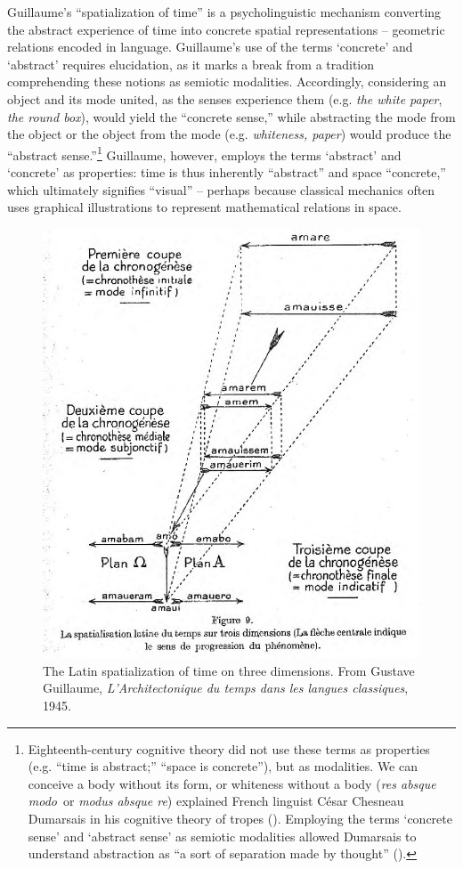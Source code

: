 \documentclass[output=paper]{langsci/langscibook}
\begin{document}
Guillaume’s “spatialization of time” is a psycholinguistic mechanism converting the abstract experience of time into concrete spatial representations -- geometric relations encoded in language. Guillaume’s use of the terms ‘concrete’ and ‘abstract’ requires elucidation, as it marks a break from a tradition comprehending these notions as semiotic modalities. Accordingly, considering an object and its mode united, as the senses experience them (e.g. \textit{the white paper}, \textit{the round box}), would yield the “concrete sense,” while abstracting the mode from the object or the object from the mode (e.g. \textit{whiteness, paper}) would produce the “abstract sense.”\footnote{Eighteenth-century cognitive theory did not use these terms as properties (e.g. “time is abstract;” “space is concrete”), but as modalities. We can conceive a body without its form, or whiteness without a body (\textit{res absque modo}~or \textit{modus absque re}) explained French linguist César Chesneau Dumarsais in his cognitive theory of tropes (\citeyear{dumarsais_tropes_1730}). Employing the terms ‘concrete sense’ and ‘abstract sense’ as semiotic modalities allowed Dumarsais to understand abstraction as “a sort of separation made by thought” (\citeyear[260]{dumarsais_tropes_1730}).} Guillaume, however, employs the terms ‘abstract’ and ‘concrete’ as properties: time is thus inherently “abstract” and space “concrete,” which ultimately signifies “visual” -- perhaps because classical mechanics often uses graphical illustrations to represent mathematical relations in space.

\begin{figure}
\includegraphics[width=.75\textwidth]{figures/03/Kap.3.001.eps}
\caption{The Latin spatialization of time on three dimensions. From Gustave Guillaume, \textit{L'Architectonique du temps dans les langues classiques}, 1945. 
\citealt[37]{guillaume_larchitectonique_1965}\label{fig:3:1}}
\end{figure}
\end{document}
